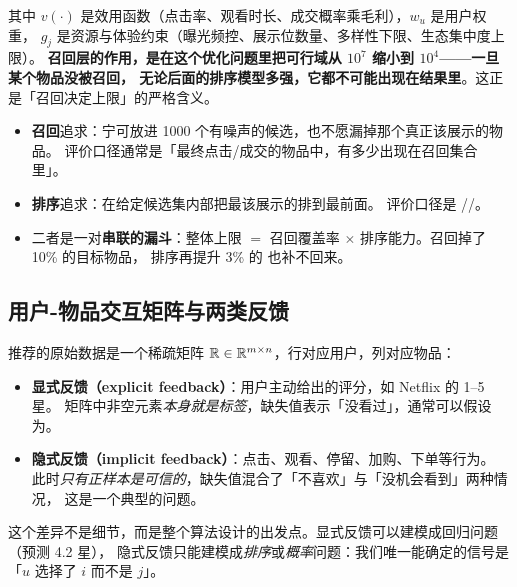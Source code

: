 其中 $v(\cdot)$ 是效用函数（点击率、观看时长、成交概率乘毛利），$w_u$ 是用户权重，
$g_j$ 是资源与体验约束（曝光频控、展示位数量、多样性下限、生态集中度上限）。
\textbf{召回层的作用，是在这个优化问题里把可行域从 $10^7$ 缩小到 $10^4$——一旦某个物品没被召回，
无论后面的排序模型多强，它都不可能出现在结果里}。这正是「召回决定上限」的严格含义。

\begin{keypoint}[召回与排序的分工]
\begin{itemize}
  \item \textbf{召回}追求：宁可放进 1000 个有噪声的候选，也不愿漏掉那个真正该展示的物品。
        评价口径通常是「最终点击/成交的物品中，有多少出现在召回集合里」。
  \item \textbf{排序}追求：在给定候选集内部把最该展示的排到最前面。
        评价口径是 //。
  \item 二者是一对\textbf{串联的漏斗}：整体上限 $=$ 召回覆盖率 $\times$ 排序能力。召回掉了 10\% 的目标物品，
        排序再提升 3\% 的  也补不回来。
\end{itemize}
\end{keypoint}

\subsection{用户-物品交互矩阵与两类反馈}

推荐的原始数据是一个稀疏矩阵 $\mathbb{R} \in \mathbb{R}^{m \times n}$，行对应用户，列对应物品：

\begin{itemize}
  \item \textbf{显式反馈（explicit feedback）}：用户主动给出的评分，如 Netflix 的 1--5 星。
        矩阵中非空元素\emph{本身就是标签}，缺失值表示「没看过」，通常可以假设为。
  \item \textbf{隐式反馈（implicit feedback）}：点击、观看、停留、加购、下单等行为。
        此时\emph{只有正样本是可信的}，缺失值混合了「不喜欢」与「没机会看到」两种情况，
        这是一个典型的问题。
\end{itemize}

这个差异不是细节，而是整个算法设计的出发点。显式反馈可以建模成回归问题（预测 4.2 星），
隐式反馈只能建模成\emph{排序}或\emph{概率}问题：我们唯一能确定的信号是「$u$ 选择了 $i$ 而不是 $j$」。


